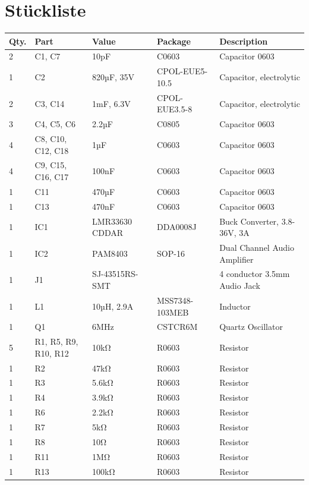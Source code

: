 \documentclass[a4paper, twoside, 12pt, openright
]{memoir}
\renewcommand{\footnotesize}{\scriptsize}
\begin{document}
\section{Stückliste}
\footnotesize\begin{longtable}{lllll}
		Qty.	& Part 					& Value 			& Package 			& Description \\ 
		\toprule\endhead
		2 		& C1, C7 				& 10pF 				& C0603 			& Capacitor 0603 \\
		1		& C2 					& 820µF, 35V 		& CPOL-EUE5-10.5 	& Capacitor, electrolytic \\ 
		2 		& C3, C14 				& 1mF, 6.3V 		& CPOL-EUE3.5-8 	& Capacitor, electrolytic \\ 
		3 		& C4, C5, C6 			& 2.2µF 			& C0805 			& Capacitor 0603 \\ 
		4 		& C8, C10, C12, C18 	& 1µF 				& C0603 			& Capacitor 0603 \\ 
		4 		& C9, C15, C16, C17 	& 100nF 			& C0603 			& Capacitor 0603 \\ 
		1 		& C11 					& 470µF 			& C0603 			& Capacitor 0603 \\ 
		1 		& C13 					& 470nF 			& C0603 			& Capacitor 0603 \\ 
		1 		& IC1 					& LMR33630 CDDAR 	& DDA0008J 			& Buck Converter, 3.8-36V, 3A \\ 
		1 		& IC2 					& PAM8403 			& SOP-16 			& Dual Channel Audio Amplifier \\ 
		1 		& J1 					& SJ-43515RS-SMT 	& 					& 4 conductor 3.5mm Audio Jack \\ 
		1 		& L1 					& 10µH, 2.9A 		& MSS7348-103MEB 	& Inductor \\ 
		1 		& Q1 					& 6MHz 				& CSTCR6M 			& Quartz Oscillator \\ %
		5 		& R1, R5, R9, R10, R12 	& 10kΩ 				& R0603 			& Resistor \\ 
		1 		& R2 					& 47kΩ 				& R0603 			& Resistor \\ 
		1 		& R3 					& 5.6kΩ 			& R0603 			& Resistor \\ 
		1 		& R4 					& 3.9kΩ 			& R0603 			& Resistor \\ 
		1 		& R6 					& 2.2kΩ 			& R0603 			& Resistor \\ 
		1 		& R7 					& 5kΩ 				& R0603 			& Resistor \\ 
		1 		& R8 					& 10Ω 				& R0603 			& Resistor \\ %
		1 		& R11 					& 1MΩ 				& R0603 			& Resistor \\ 
		1 		& R13 					& 100kΩ 			& R0603 			& Resistor \\ 

\end{longtable}
\end{document}
